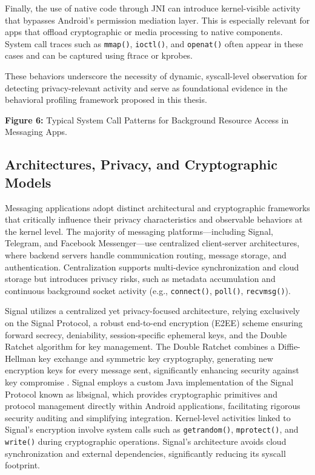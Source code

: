 \documentclass[a4paper,12pt]{report}
\begin{document}
Finally, the use of native code through JNI can introduce kernel-visible activity that bypasses Android’s permission mediation layer. This is especially relevant for apps that offload cryptographic or media processing to native components. System call traces such as \texttt{mmap()}, \texttt{ioctl()}, and \texttt{openat()} often appear in these cases and can be captured using ftrace or kprobes.

These behaviors underscore the necessity of dynamic, syscall-level observation for detecting privacy-relevant activity and serve as foundational evidence in the behavioral profiling framework proposed in this thesis.

\textbf{Figure 6:} Typical System Call Patterns for Background Resource Access in Messaging Apps.

\subsection{Architectures, Privacy, and Cryptographic Models}
Messaging applications adopt distinct architectural and cryptographic frameworks that critically influence their privacy characteristics and observable behaviors at the kernel level. The majority of messaging platforms—including Signal, Telegram, and Facebook Messenger—use centralized client-server architectures, where backend servers handle communication routing, message storage, and authentication. Centralization supports multi-device synchronization and cloud storage but introduces privacy risks, such as metadata accumulation and continuous background socket activity (e.g., \texttt{connect()}, \texttt{poll()}, \texttt{recvmsg()}).

Signal utilizes a centralized yet privacy-focused architecture, relying exclusively on the Signal Protocol, a robust end-to-end encryption (E2EE) scheme ensuring forward secrecy, deniability, session-specific ephemeral keys, and the Double Ratchet algorithm for key management. The Double Ratchet combines a Diffie-Hellman key exchange and symmetric key cryptography, generating new encryption keys for every message sent, significantly enhancing security against key compromise \cite{signalwhitepaper}. Signal employs a custom Java implementation of the Signal Protocol known as libsignal, which provides cryptographic primitives and protocol management directly within Android applications, facilitating rigorous security auditing and simplifying integration. Kernel-level activities linked to Signal’s encryption involve system calls such as \texttt{getrandom()}, \texttt{mprotect()}, and \texttt{write()} during cryptographic operations. Signal's architecture avoids cloud synchronization and external dependencies, significantly reducing its syscall footprint.
\end{document}
